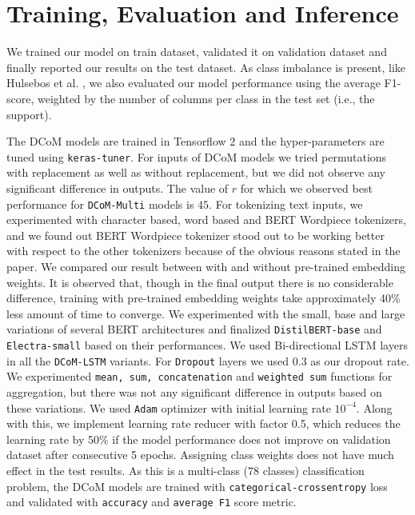 \documentclass{article}
\begin{document}
\section{Training, Evaluation and Inference}
\label{sec:training}

We trained our model on train dataset, validated it on validation dataset and finally reported our results on the test dataset. As class imbalance is present, like Hulsebos et al. \cite{Hulsebos}, we also evaluated our model performance using the average F1-score, weighted by the number of columns per class in the test set (i.e., the support). 

The DCoM models are trained in Tensorflow 2 \cite{tensorflow2015-whitepaper} and the hyper-parameters are tuned using \texttt{keras-tuner}\cite{kerastuner}. For inputs of DCoM models we tried permutations with replacement as well as without replacement, but we did not observe any significant difference in outputs. The value of $r$ for which we observed best performance for \texttt{DCoM-Multi} models is $45$. For tokenizing text inputs, we experimented with character based, word based and BERT Wordpiece\cite{wordpiece} tokenizers, and we found out BERT Wordpiece tokenizer stood out to be working better with respect to the other tokenizers because of the obvious reasons stated in the paper\cite{wordpiece}. We compared our result between with and without pre-trained embedding weights. It is observed that, though in the final output there is no considerable difference, training with pre-trained embedding weights take approximately 40\% less amount of time to converge. We experimented with the small, base and large variations of several BERT architectures and finalized \texttt{DistilBERT-base}\cite{distilbert} and \texttt{Electra-small}\cite{electra} based on their performances. We used Bi-directional LSTM layers in all the \texttt{DCoM-LSTM} variants. For \texttt{Dropout} layers we used $0.3$ as our dropout rate. We experimented \texttt{mean, sum, concatenation} and \texttt{weighted sum} functions for aggregation, but there was not any significant difference in outputs based on these variations. We used \texttt{Adam}\cite{adam} optimizer with initial learning rate $10^{-4}$. Along with this, we implement learning rate reducer with factor 0.5, which reduces the learning rate by 50\% if the model performance does not improve on validation dataset after consecutive 5 epochs. Assigning class weights does not have much effect in the test results. As this is a multi-class (78 classes) classification problem, the DCoM models are trained with \texttt{categorical-crossentropy} loss and validated with \texttt{accuracy} and \texttt{average F1} score metric.
\end{document}
